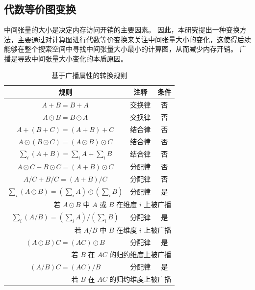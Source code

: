 \subsection{代数等价图变换}
中间张量的大小是决定内存访问开销的主要因素。
因此，本研究提出一种变换方法，主要通过对计算图进行代数等价变换来关注中间张量大小的变化，这使得后续能够在整个搜索空间中寻找中间张量大小最小的计算图，从而减少内存开销。
{广播是导致中间张量大小变化的本质原因}。


\begin{table}[ht]
    \centering
    \caption{基于广播属性的转换规则}
    \begin{tabular}{ccc}
       \toprule
       规则  & 注释 & 条件 \\
       \hline
       $A + B = B + A$  & 交换律 & 否 \\  
       $A \odot B = B \odot A$  & 交换律 & 否 \\  
       
       $A + (B + C) = (A + B) + C$  & 结合律 & 否 \\  
       $A \odot (B \odot C) = (A \odot B) \odot C$  & 结合律 & 否 \\  
       $\sum_i(A + B) = \sum_iA + \sum_iB$ & 结合律 & 否 \\

       $A \odot C + B \odot C = (A + B) \odot C$ & 分配律 & 否 \\
       $A / C + B / C = (A + B) / C$ & 分配律 & 否 \\

        \hline

       $\sum_i(A \odot B) = (\sum_iA) \odot (\sum_iB)$ & 分配律 & 是 \\
       \multicolumn{3}{r}{若 $A \odot B$ 中 $A$ 或 $B$ 在维度 $i$ 上被广播} \\
       
       $\sum_i(A / B) = (\sum_iA) / (\sum_iB)$ & 分配律 & 是 \\
       \multicolumn{3}{r}{若 $A / B$ 中 $B$ 在维度 $i$ 上被广播} \\
       
       $(A \odot B)C = (AC) \odot B$ & 分配律 & 是 \\
       \multicolumn{3}{r}{若 $B$ 在 $AC$ 的归约维度上被广播} \\
       
       $(A / B)C = (AC) / B$ & 分配律 & 是 \\
       \multicolumn{3}{r}{若 $B$ 在 $AC$ 的归约维度上被广播} \\
       \bottomrule
    \end{tabular}
    \label{tab:broadcast_based_transform}
\end{table}




